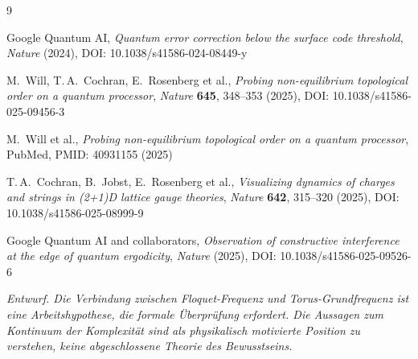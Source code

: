 \begin{thebibliography}{9}

Google Quantum AI,
\textit{Quantum error correction below the surface code threshold},
\textit{Nature} (2024), DOI: 10.1038/s41586-024-08449-y

M.~Will, T.\,A.~Cochran, E.~Rosenberg et al.,
\textit{Probing non-equilibrium topological order on a quantum processor},
\textit{Nature} \textbf{645}, 348--353 (2025),
DOI: 10.1038/s41586-025-09456-3

M.~Will et al.,
\textit{Probing non-equilibrium topological order on a quantum processor},
PubMed, PMID: 40931155 (2025)

T.\,A.~Cochran, B.~Jobst, E.~Rosenberg et al.,
\textit{Visualizing dynamics of charges and strings in (2+1)D lattice gauge theories},
\textit{Nature} \textbf{642}, 315--320 (2025),
DOI: 10.1038/s41586-025-08999-9

Google Quantum AI and collaborators,
\textit{Observation of constructive interference at the edge of quantum ergodicity},
\textit{Nature} (2025), DOI: 10.1038/s41586-025-09526-6

\end{thebibliography}

\vspace{0.5cm}
\noindent
\textit{Entwurf. Die Verbindung zwischen Floquet-Frequenz und Torus-Grundfrequenz
ist eine Arbeitshypothese, die formale Überprüfung erfordert. Die Aussagen zum
Kontinuum der Komplexität sind als physikalisch motivierte Position zu verstehen,
keine abgeschlossene Theorie des Bewusstseins.}

